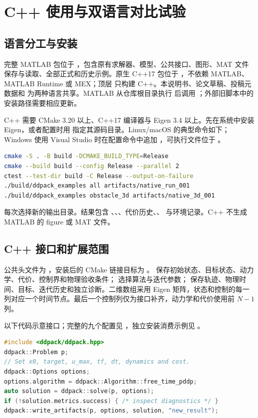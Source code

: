 \chapter{C++ 使用与双语言对比试验}
\label{chap:dual-language}

\section{语言分工与安装}

完整 MATLAB 包位于 ，包含原有求解器、模型、公共接口、图形、MAT 文件保存与读取、全部正式和历史示例。原生 C++17 包位于 ，不依赖 MATLAB、MATLAB Runtime 或 MEX；顶层  只构建 C++。本说明书、论文草稿、投稿元数据和  为两种语言共享。MATLAB 从仓库根目录执行  后调用 ；外部旧脚本中的安装路径需要相应更新。

C++ 需要 CMake 3.20 以上、C++17 编译器与 Eigen 3.4 以上。先在系统中安装 Eigen，或者配置时用  指定其源码目录。Linux/macOS 的典型命令如下；Windows 使用 Visual Studio 时在配置命令中追加 ，可执行文件位于 。
\begin{lstlisting}[language=bash]
cmake -S . -B build -DCMAKE_BUILD_TYPE=Release
cmake --build build --config Release --parallel 2
ctest --test-dir build -C Release --output-on-failure
./build/ddpack_examples all artifacts/native_run_001
./build/ddpack_examples obstacle_3d artifacts/native_3d_001
\end{lstlisting}
每次选择新的输出目录。结果包含 、、、代价历史、、 与环境记录。C++ 不生成 MATLAB 的 figure 或 MAT 文件。

\section{C++ 接口和扩展范围}

公共头文件为 ，安装后的 CMake 链接目标为 。 保存初始状态、目标状态、动力学、代价、控制界和物理验收条件； 选择算法与迭代参数； 保存轨迹、物理时间、目标、迭代历史和独立诊断。二维数组采用 Eigen 矩阵，状态和控制的每一列对应一个时间节点。最后一个控制列仅为接口补齐，动力学和代价使用前 $N-1$ 列。

以下代码示意接口；完整的九个配置见 ，独立安装消费示例见 。
\begin{lstlisting}[language=C++]
#include <ddpack/ddpack.hpp>
ddpack::Problem p;
// Set x0, target, u_max, tf, dt, dynamics and cost.
ddpack::Options options;
options.algorithm = ddpack::Algorithm::free_time_pddp;
auto solution = ddpack::solve(p, options);
if (!solution.metrics.success) { /* inspect diagnostics */ }
ddpack::write_artifacts(p, options, solution, "new_result");
\end{lstlisting}

